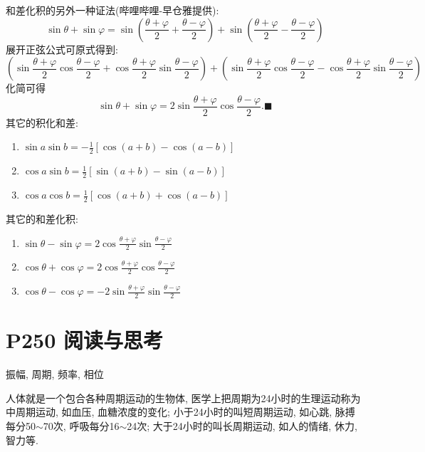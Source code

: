 \documentclass{book}
\begin{document}
    和差化积的另外一种证法(哔哩哔哩-早仓雅提供):
    $$
        \sin \theta + \sin \varphi =\sin \left( \frac{\theta+\varphi}{2}+ \frac{\theta -\varphi}{2} \right)+\sin \left( \frac{\theta+\varphi}{2}- \frac{\theta -\varphi}{2} \right)
    $$
    展开正弦公式可原式得到:
    $$
        \left( \sin \frac{\theta +\varphi}{2}\cos \frac{\theta -\varphi}{2}+\cos \frac{\theta +\varphi}{2}\sin \frac{\theta -\varphi}{2} \right)+\left( \sin \frac{\theta +\varphi}{2}\cos \frac{\theta -\varphi}{2}-\cos \frac{\theta +\varphi}{2}\sin \frac{\theta -\varphi}{2} \right)
    $$
    化简可得
    $$
        \sin \theta + \sin \varphi = 2\sin\frac{\theta+\varphi}{2}\cos\frac{\theta-\varphi}{2}.\blacksquare
    $$
    其它的\textcolor[rgb]{0.38,0.11,0.2}{积化和差}:
    \begin{enumerate}
        \item $\displaystyle \sin a\sin b=-\frac{1}{2}[\cos(a+b)-\cos(a-b)]$
        \item $\displaystyle \cos a\sin b=\frac{1}{2}[\sin(a+b)-\sin(a-b)]$
        \item $\displaystyle \cos a\cos b=\frac{1}{2}[\cos(a+b) +\cos(a-b)]$
    \end{enumerate}

    其它的\textcolor[rgb]{0.38,0.11,0.2}{和差化积}:

    \begin{enumerate}
        \item $\displaystyle \sin \theta-\sin \varphi=2\cos\frac{\theta+\varphi}{2}\sin\frac{\theta-\varphi}{2}$
        \item $\displaystyle \cos \theta+\cos \varphi=2\cos \frac{\theta+\varphi}{2} \cos \frac{\theta-\varphi}{2}$
        \item $\displaystyle \cos \theta-\cos \varphi=-2\sin \frac{\theta+\varphi}{2} \sin \frac{\theta-\varphi}{2}$
    \end{enumerate}

    \section{\textcolor[rgb]{0.11,0.65,0.52}{P250 阅读与思考}}

    \begin{center}
        振幅, 周期, 频率, 相位
    \end{center}

    人体就是一个包合各种周期运动的生物体, 医学上把周期为24小时的生理运动称为中周期运动, 如血压, 血糖浓度的变化; 小于24小时的叫短周期运动,  如心跳, 脉搏每分50$\sim$70次, 呼吸每分16$\sim$24次; 大于24小时的叫长周期运动, 如人的情绪, 休力, 智力等.
\end{document}
